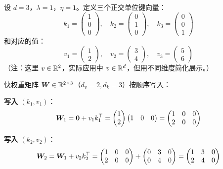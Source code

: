 \begin{example}[3 键值对的精确检索]
设 $d = 3$，$\lambda = 1$，$\eta = 1$。定义三个正交单位键向量：
\[
  k_1 = \begin{pmatrix} 1 \\ 0 \\ 0 \end{pmatrix},\quad
  k_2 = \begin{pmatrix} 0 \\ 1 \\ 0 \end{pmatrix},\quad
  k_3 = \begin{pmatrix} 0 \\ 0 \\ 1 \end{pmatrix}
\]
和对应的值：
\[
  v_1 = \begin{pmatrix} 1 \\ 2 \end{pmatrix},\quad
  v_2 = \begin{pmatrix} 3 \\ 4 \end{pmatrix},\quad
  v_3 = \begin{pmatrix} 5 \\ 6 \end{pmatrix}
\]
（注：这里 $v \in \mathbb{R}^2$，实际应用中 $v \in \mathbb{R}^d$，但用不同维度简化展示。）

快权重矩阵 $\boldsymbol{W} \in \mathbb{R}^{2 \times 3}$（$d_v = 2, d_k = 3$）按顺序写入：

\textbf{写入 $(k_1, v_1)$}：
\[
  \boldsymbol{W}_1 = \mathbf{0} + v_1 k_1^\top = 
  \begin{pmatrix} 1 \\ 2 \end{pmatrix} \begin{pmatrix} 1 & 0 & 0 \end{pmatrix} = 
  \begin{pmatrix} 1 & 0 & 0 \\ 2 & 0 & 0 \end{pmatrix}
\]

\textbf{写入 $(k_2, v_2)$}：
\[
  \boldsymbol{W}_2 = \boldsymbol{W}_1 + v_2 k_2^\top = 
  \begin{pmatrix} 1 & 0 & 0 \\ 2 & 0 & 0 \end{pmatrix} + 
  \begin{pmatrix} 0 & 3 & 0 \\ 0 & 4 & 0 \end{pmatrix} = 
  \begin{pmatrix} 1 & 3 & 0 \\ 2 & 4 & 0 \end{pmatrix}
\]


\end{example}
